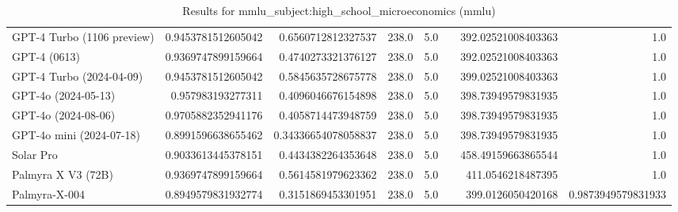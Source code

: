 \begin{table}[htp]
{\begin{tabular}{lrrrrrrr}
GPT-4 Turbo (1106 preview) & 0.9453781512605042 & 0.6560712812327537 & 238.0 & 5.0 &  & 392.02521008403363 & 1.0 \\
GPT-4 (0613) & 0.9369747899159664 & 0.4740273321376127 & 238.0 & 5.0 &  & 392.02521008403363 & 1.0 \\
GPT-4 Turbo (2024-04-09) & 0.9453781512605042 & 0.5845635728675778 & 238.0 & 5.0 &  & 399.02521008403363 & 1.0 \\
GPT-4o (2024-05-13) & 0.957983193277311 & 0.4096046676154898 & 238.0 & 5.0 &  & 398.73949579831935 & 1.0 \\
GPT-4o (2024-08-06) & 0.9705882352941176 & 0.4058714473948759 & 238.0 & 5.0 &  & 398.73949579831935 & 1.0 \\
GPT-4o mini (2024-07-18) & 0.8991596638655462 & 0.34336654078058837 & 238.0 & 5.0 &  & 398.73949579831935 & 1.0 \\
Solar Pro & 0.9033613445378151 & 0.4434382264353648 & 238.0 & 5.0 &  & 458.49159663865544 & 1.0 \\
Palmyra X V3 (72B) & 0.9369747899159664 & 0.5614581979623362 & 238.0 & 5.0 &  & 411.0546218487395 & 1.0 \\
Palmyra-X-004 & 0.8949579831932774 & 0.3151869453301951 & 238.0 & 5.0 &  & 399.0126050420168 & 0.9873949579831933 \\
\bottomrule
\end{tabular}}
\caption{Results for mmlu_subject:high_school_microeconomics (mmlu)}
\label{fig:mmlu_subject:high_school_microeconomics (mmlu)}
\end{table}